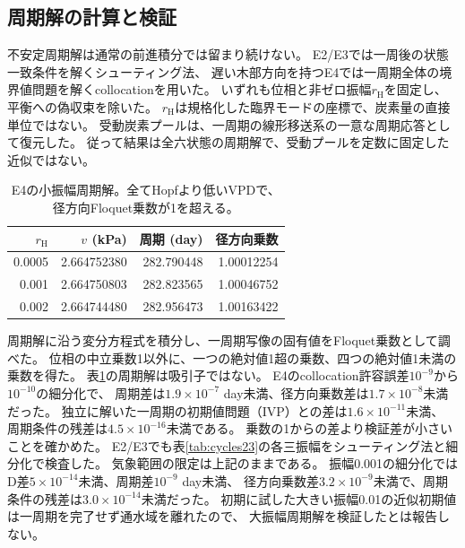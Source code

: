 \documentclass[a4paper,11pt]{ltjsarticle}
\begin{document}
\subsection{周期解の計算と検証}\label{sec:cycles}
不安定周期解は通常の前進積分では留まり続けない。
E2/E3では一周後の状態一致条件を解くシューティング法、
遅い木部方向を持つE4では一周期全体の境界値問題を解くcollocationを用いた。
いずれも位相と非ゼロ振幅$r_{\mathrm H}$を固定し、平衡への偽収束を除いた。
$r_{\mathrm H}$は規格化した臨界モードの座標で、炭素量の直接単位ではない。
受動炭素プールは、一周期の線形移送系の一意な周期応答として復元した。
従って結果は全六状態の周期解で、受動プールを定数に固定した近似ではない。

\begin{table}[tb]
\centering
\caption{E4の小振幅周期解。全てHopfより低いVPDで、径方向Floquet乗数が1を超える。}\label{tab:cycles}
\begin{tabular}{rrrr}
\toprule
$r_{\mathrm H}$&$v$ (kPa)&周期 (day)&径方向乗数\\\midrule
0.0005&2.664752380&282.790448&1.00012254\\
0.001&2.664750803&282.823565&1.00046752\\
0.002&2.664744480&282.956473&1.00163422\\
\bottomrule
\end{tabular}
\end{table}

周期解に沿う変分方程式を積分し、一周期写像の固有値をFloquet乗数として調べた。
位相の中立乗数1以外に、一つの絶対値1超の乗数、四つの絶対値1未満の乗数を得た。
表\ref{tab:cycles}の周期解は吸引子ではない。
E4のcollocation許容誤差$10^{-9}$から$10^{-10}$の細分化で、
周期差は$1.9\times10^{-7}$ day未満、径方向乗数差は$1.7\times10^{-8}$未満だった。
独立に解いた一周期の初期値問題（IVP）との差は$1.6\times10^{-11}$未満、
周期条件の残差は$4.5\times10^{-16}$未満である。
乗数の1からの差より検証差が小さいことを確かめた。
E2/E3でも表\ref{tab:cycles23}の各三振幅をシューティング法と細分化で検査した。
気象範囲の限定は上記のままである。
振幅0.001の細分化ではD差$5\times10^{-14}$未満、周期差$10^{-9}$ day未満、
径方向乗数差$3.2\times10^{-9}$未満で、周期条件の残差は$3.0\times10^{-14}$未満だった。
初期に試した大きい振幅0.01の近似初期値は一周期を完了せず通水域を離れたので、
大振幅周期解を検証したとは報告しない。
\end{document}
